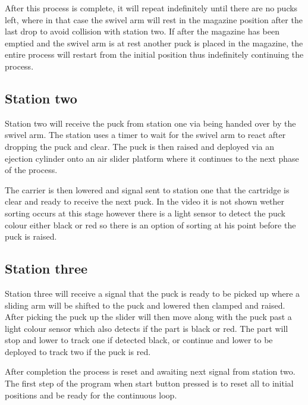 \documentclass[a4paper, 10pt,  conference]{article}
\begin{document}
After this process is complete, it will repeat indefinitely until there are no pucks left, where in that case the swivel arm will rest in the magazine position after the last drop to avoid collision with station two. If after the magazine has been emptied and the swivel arm is at rest another puck is placed in the magazine, the entire process will restart from the initial position thus indefinitely continuing the process.


\clearpage
\subsection{Station two}
Station two will receive the puck from station one via being handed over by the swivel arm. The station uses a timer to wait for the swivel arm to react after dropping the puck and clear. The puck is then raised and deployed via an ejection cylinder onto an air slider platform where it continues to the next phase of the process.

The carrier is then lowered and signal sent to station one that the cartridge is clear and ready to receive the next puck. In the video it is not shown wether sorting occurs at this stage however there is a light sensor to detect the puck colour either black or red so there is an option of sorting at his point before the puck is raised.



\subsection{Station three}
Station three will receive a signal that the puck is ready to be picked up where a sliding arm will be shifted to the puck and lowered then clamped and raised. After picking the puck up the slider will then move along with the puck past a light colour sensor which also detects if the part is black or red. The part will stop and lower to track one if detected black, or continue and lower to be deployed to track two if the puck is red.

After completion the process is reset and awaiting next signal from station two. The first step of the program when start button pressed is to reset all to initial positions and be ready for the continuous loop.


\end{document}

